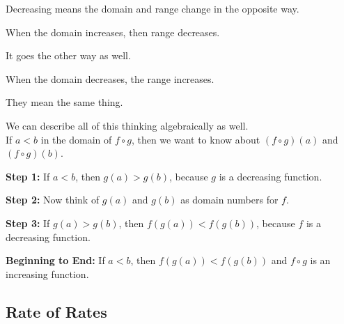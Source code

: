 \documentclass{ximera}
\begin{document}
\begin{warning}

Decreasing means the domain and range change in the opposite way.

When the domain increases, then range decreases.

It goes the other way as well.

When the domain decreases, the range increases.

They mean the same thing.


\end{warning}






We can describe all of this thinking algebraically as well. \\


If $a < b$ in the domain of $f \circ g$, then we want to know about $(f \circ g)(a)$  and $(f \circ g)(b)$.



\textbf{Step 1:}  If $a < b$, then $g(a) > g(b)$, because $g$ is a decreasing function.


\textbf{Step 2:}  Now think of $g(a)$ and $g(b)$ as domain numbers for $f$.


\textbf{Step 3:}  If $g(a) > g(b)$, then $f(g(a)) < f(g(b))$, because $f$ is a decreasing function.


\textbf{Beginning to End:} If $a < b$, then $f(g(a)) < f(g(b))$ and $f \circ g$ is an increasing function.

















































\subsection*{Rate of Rates}
\end{document}

